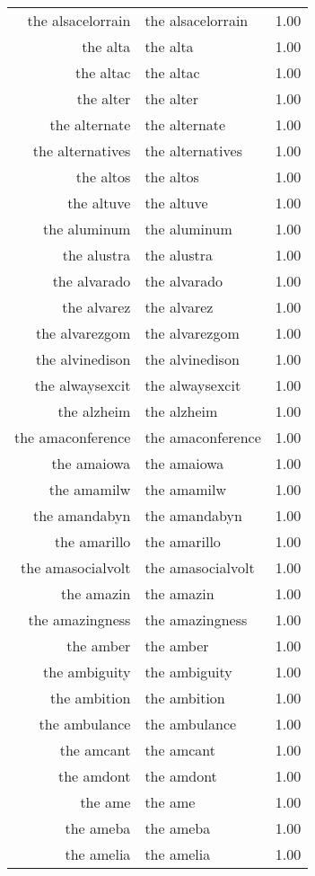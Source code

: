\begin{table}[ht]
\begin{tabular}{rlr}
  the alsacelorrain & the alsacelorrain & 1.00 \\ 
  the alta & the alta & 1.00 \\ 
  the altac & the altac & 1.00 \\ 
  the alter & the alter & 1.00 \\ 
  the alternate & the alternate & 1.00 \\ 
  the alternatives & the alternatives & 1.00 \\ 
  the altos & the altos & 1.00 \\ 
  the altuve & the altuve & 1.00 \\ 
  the aluminum & the aluminum & 1.00 \\ 
  the alustra & the alustra & 1.00 \\ 
  the alvarado & the alvarado & 1.00 \\ 
  the alvarez & the alvarez & 1.00 \\ 
  the alvarezgom & the alvarezgom & 1.00 \\ 
  the alvinedison & the alvinedison & 1.00 \\ 
  the alwaysexcit & the alwaysexcit & 1.00 \\ 
  the alzheim & the alzheim & 1.00 \\ 
  the amaconference & the amaconference & 1.00 \\ 
  the amaiowa & the amaiowa & 1.00 \\ 
  the amamilw & the amamilw & 1.00 \\ 
  the amandabyn & the amandabyn & 1.00 \\ 
  the amarillo & the amarillo & 1.00 \\ 
  the amasocialvolt & the amasocialvolt & 1.00 \\ 
  the amazin & the amazin & 1.00 \\ 
  the amazingness & the amazingness & 1.00 \\ 
  the amber & the amber & 1.00 \\ 
  the ambiguity & the ambiguity & 1.00 \\ 
  the ambition & the ambition & 1.00 \\ 
  the ambulance & the ambulance & 1.00 \\ 
  the amcant & the amcant & 1.00 \\ 
  the amdont & the amdont & 1.00 \\ 
  the ame & the ame & 1.00 \\ 
  the ameba & the ameba & 1.00 \\ 
  the amelia & the amelia & 1.00 \\ 

\end{tabular}
\end{table}
